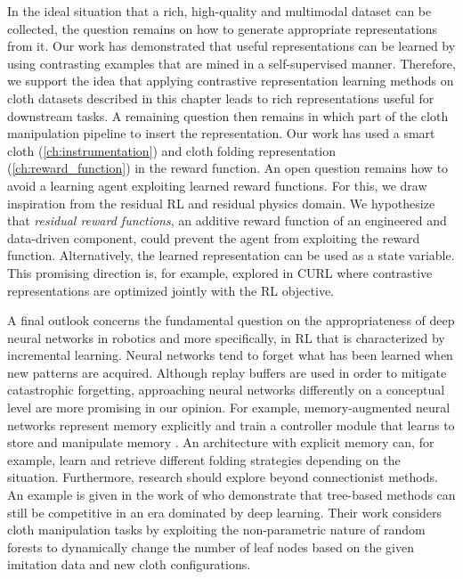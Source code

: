 \documentclass[\home/main.tex]{subfiles}
\begin{document}
In the ideal situation that a rich, high-quality and multimodal dataset can be collected, the question remains on how to generate appropriate representations from it. Our work has demonstrated that useful representations can be learned by using contrasting examples that are mined in a self-supervised manner. Therefore, we support the idea that applying contrastive representation learning methods on cloth datasets described in this chapter leads to rich representations useful for downstream tasks. A remaining question then remains in which part of the cloth manipulation pipeline to insert the representation. Our work has used a smart cloth (\cref{ch:instrumentation}) and cloth folding representation (\cref{ch:reward_function}) in the reward function. An open question remains how to avoid a learning agent exploiting learned reward functions. For this, we draw inspiration from the residual RL and residual physics domain. We hypothesize that \emph{residual reward functions}, an additive reward function of an engineered and data-driven component, could prevent the agent from exploiting the reward function. Alternatively, the learned representation can be used as a state variable. This promising direction is, for example, explored in CURL \autocite{Srinivas2020CURL} where contrastive representations are optimized jointly with the RL objective. 

A final outlook concerns the fundamental question on the appropriateness of deep neural networks in robotics and more specifically, in \gls{RL} that is characterized by incremental learning. Neural networks tend to forget what has been learned when new patterns are acquired. Although replay buffers are used in order to mitigate catastrophic forgetting, approaching neural networks differently on a conceptual level are more promising in our opinion. For example, memory-augmented neural networks represent memory explicitly and train a controller module that learns to store and manipulate memory \autocite{graves2014neural}. An architecture with explicit memory can, for example, learn and retrieve different folding strategies depending on the situation. Furthermore, research should explore beyond connectionist methods. An example is given in the work of \textcite{Jia2019} who demonstrate that tree-based methods can still be competitive in an era dominated by deep learning. Their work considers cloth manipulation tasks by exploiting the non-parametric nature of random forests to dynamically change the number of leaf nodes based on the given imitation data and new cloth configurations.
\end{document}
